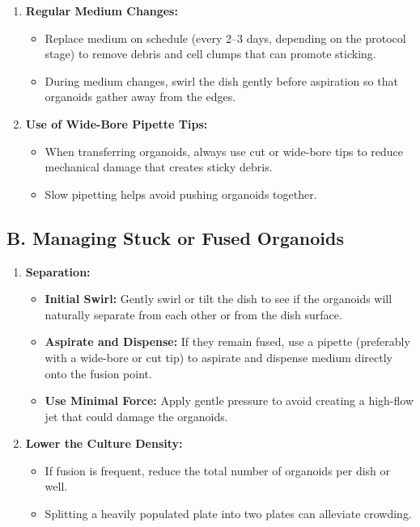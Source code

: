 \documentclass[11pt]{article}
\begin{document}
\begin{enumerate}[leftmargin=*]
    \item \textbf{Regular Medium Changes:}
    \begin{itemize}[leftmargin=*]
        \item Replace medium on schedule (every 2–3 days, depending on the protocol stage) to remove debris and cell clumps that can promote sticking.
        \item During medium changes, swirl the dish gently before aspiration so that organoids gather away from the edges.
    \end{itemize}

    \item \textbf{Use of Wide-Bore Pipette Tips:}
    \begin{itemize}[leftmargin=*]
        \item When transferring organoids, always use cut or wide-bore tips to reduce mechanical damage that creates sticky debris.
        \item Slow pipetting helps avoid pushing organoids together.
    \end{itemize}
\end{enumerate}

\subsection{B. Managing Stuck or Fused Organoids}

\begin{enumerate}[leftmargin=*]
    \item \textbf{Separation:}
    \begin{itemize}[leftmargin=*]
        \item \textbf{Initial Swirl:} Gently swirl or tilt the dish to see if the organoids will naturally separate from each other or from the dish surface.
        \item \textbf{Aspirate and Dispense:} If they remain fused, use a pipette (preferably with a wide-bore or cut tip) to aspirate and dispense medium directly onto the fusion point.
        \item \textbf{Use Minimal Force:} Apply gentle pressure to avoid creating a high-flow jet that could damage the organoids.
    \end{itemize}

    \item \textbf{Lower the Culture Density:}
    \begin{itemize}[leftmargin=*]
        \item If fusion is frequent, reduce the total number of organoids per dish or well.
        \item Splitting a heavily populated plate into two plates can alleviate crowding.
    \end{itemize}
\end{enumerate}
\end{document}
